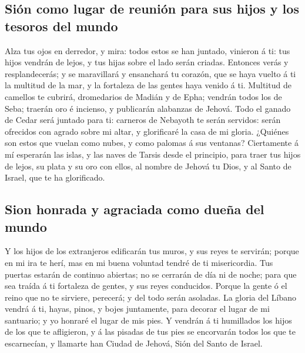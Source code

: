 \hypertarget{siuxf3n-como-lugar-de-reuniuxf3n-para-sus-hijos-y-los-tesoros-del-mundo}{%
\subsection{Sión como lugar de reunión para sus hijos y los tesoros del
mundo}\label{siuxf3n-como-lugar-de-reuniuxf3n-para-sus-hijos-y-los-tesoros-del-mundo}}

 Alza tus ojos en derredor, y mira: todos estos se han
juntado, vinieron á ti: tus hijos vendrán de lejos, y tus hijas sobre el
lado serán criadas.  Entonces verás y resplandecerás; y se
maravillará y ensanchará tu corazón, que se haya vuelto á ti la multitud
de la mar, y la fortaleza de las gentes haya venido á ti. 
Multitud de camellos te cubrirá, dromedarios de Madián y de Epha;
vendrán todos los de Seba; traerán oro é incienso, y publicarán
alabanzas de Jehová.  Todo el ganado de Cedar será juntado
para ti: carneros de Nebayoth te serán servidos: serán ofrecidos con
agrado sobre mi altar, y glorificaré la casa de mi gloria. 
¿Quiénes son estos que vuelan como nubes, y como palomas á sus ventanas?
 Ciertamente á mí esperarán las islas, y las naves de Tarsis
desde el principio, para traer tus hijos de lejos, su plata y su oro con
ellos, al nombre de Jehová tu Dios, y al Santo de Israel, que te ha
glorificado.

\hypertarget{sion-honrada-y-agraciada-como-dueuxf1a-del-mundo}{%
\subsection{Sion honrada y agraciada como dueña del
mundo}\label{sion-honrada-y-agraciada-como-dueuxf1a-del-mundo}}

 Y los hijos de los extranjeros edificarán tus muros, y sus
reyes te servirán; porque en mi ira te herí, mas en mi buena voluntad
tendré de ti misericordia.  Tus puertas estarán de continuo
abiertas; no se cerrarán de día ni de noche; para que sea traída á ti
fortaleza de gentes, y sus reyes conducidos.  Porque la
gente ó el reino que no te sirviere, perecerá; y del todo serán
asoladas.  La gloria del Líbano vendrá á ti, hayas, pinos,
y bojes juntamente, para decorar el lugar de mi santuario; y yo honraré
el lugar de mis pies.  Y vendrán á ti humillados los hijos
de los que te afligieron, y á las pisadas de tus pies se encorvarán
todos los que te escarnecían, y llamarte han Ciudad de Jehová, Sión del
Santo de Israel.

